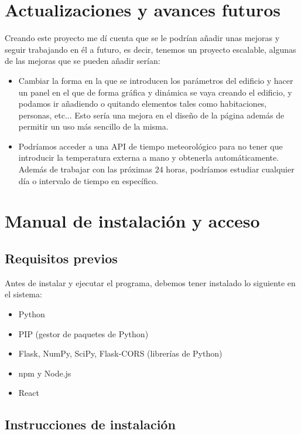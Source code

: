 \section{Actualizaciones y avances futuros}
Creando este proyecto me dí cuenta que se le podrían añadir unas mejoras y seguir trabajando en él a futuro, es decir, tenemos un proyecto escalable, algunas de las mejoras que se pueden añadir serían:
\begin{itemize}
	\item Cambiar la forma en la que se introducen los parámetros del edificio y hacer un panel en el que de forma gráfica y dinámica se vaya creando el edificio, y podamos ir añadiendo o quitando elementos tales como habitaciones, personas, etc... Esto sería una mejora en el diseño de la página además de permitir un uso más sencillo de la misma.
	\item Podríamos acceder a una API de tiempo meteorológico para no tener que introducir la temperatura externa a mano y obtenerla automáticamente. Además de trabajar con las próximas $24$ horas, podríamos estudiar cualquier día o intervalo de tiempo en específico.
\end{itemize}
\section{Manual de instalación y acceso}
\subsection{Requisitos previos}
Antes de instalar y ejecutar el programa, debemos tener instalado lo siguiente en el sistema:
\begin{itemize}
	\item Python
	\item PIP (gestor de paquetes de Python)
	\item Flask, NumPy, SciPy, Flask-CORS (librerías de Python)
	\item npm y Node.js
	\item React
\end{itemize}
\subsection{Instrucciones de instalación}
